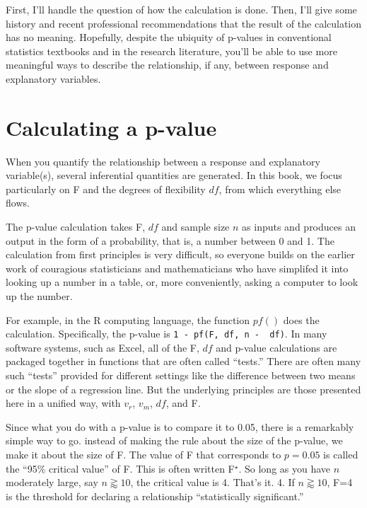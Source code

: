 \documentclass[]{book}
\begin{document}
First, I'll handle the question of how the calculation is done. Then, I'll give some history and recent professional recommendations that the result of the calculation has no meaning. Hopefully, despite the ubiquity of p-values in conventional statistics textbooks and in the research literature, you'll be able to use more meaningful ways to describe the relationship, if any, between response and explanatory variables.

\hypertarget{calculating-a-p-value}{%
\section{Calculating a p-value}\label{calculating-a-p-value}}

When you quantify the relationship between a response and explanatory variable(s), several inferential quantities are generated. In this book, we focus particularly on F and the degrees of flexibility \(df\), from which everything else flows.

The p-value calculation takes F, \(df\) and sample size \(n\) as inputs and produces an output in the form of a probability, that is, a number between 0 and 1. The calculation from first principles is very difficult, so everyone builds on the earlier work of couragious statisticians and mathematicians who have simplifed it into looking up a number in a table, or, more conveniently, asking a computer to look up the number.

For example, in the R computing language, the function \(pf()\) does the calculation. Specifically, the p-value is \texttt{1\ -\ pf(F,\ df,\ n\ -\ \ df)}. In many software systems, such as Excel, all of the F, \(df\) and p-value calculations are packaged together in functions that are often called ``tests.'' There are often many such ``tests'' provided for different settings like the difference between two means or the slope of a regression line. But the underlying principles are those presented here in a unified way, with \(v_r\), \(v_m\), \(df\), and F.

Since what you do with a p-value is to compare it to 0.05, there is a remarkably simple way to go. instead of making the rule about the size of the p-value, we make it about the size of F. The value of F that corresponds to \(p = 0.05\) is called the ``95\% critical value'' of F. This is often written F\(^\star\). So long as you have \(n\) moderately large, say \(n \gtrapprox 10\), the critical value is 4. That's it. 4. If \(n \gtrapprox 10\), F=4 is the threshold for declaring a relationship ``statistically significant.''
\end{document}
